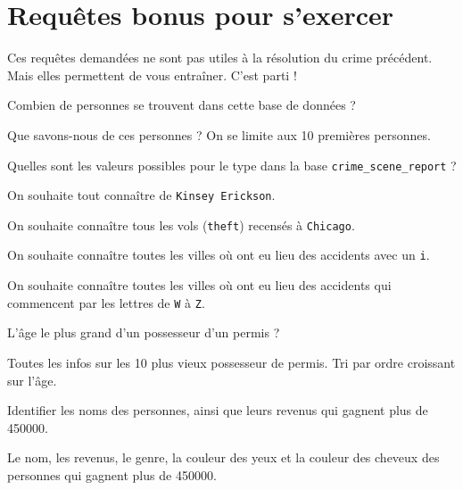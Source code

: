 \section*{Requêtes bonus pour s'exercer}
Ces requêtes demandées ne sont pas utiles à la résolution du crime précédent. Mais elles permettent de vous entraîner. C'est parti !

\question{}
Combien de personnes se trouvent dans cette base de données ?


\question{}
Que savons-nous de ces personnes ? On se limite aux 10 premières personnes.


\question{}
Quelles sont les valeurs possibles pour le type dans la base \texttt{crime\_scene\_report} ?


\question{}
On souhaite tout connaître de \texttt{Kinsey Erickson}.



\question{}
On souhaite connaître tous les vols (\texttt{theft}) recensés à \texttt{Chicago}.


\question{}
On souhaite connaître toutes les villes où ont eu lieu des accidents avec un \texttt{i}.


\question{}
On souhaite connaître toutes les villes où ont eu lieu des accidents qui commencent par les lettres  de \texttt{W} à \texttt{Z}.



\question{}
L'âge le plus grand d'un possesseur d'un permis ?



\question{}
Toutes les infos sur les 10 plus vieux possesseur de permis. Tri par ordre croissant sur l'âge.



\question{}
Identifier les noms des personnes, ainsi que leurs revenus qui gagnent plus de \num{450000}.



\question{}
Le nom, les revenus, le genre, la couleur des yeux et la couleur des cheveux des personnes qui gagnent plus de \num{450000}.



